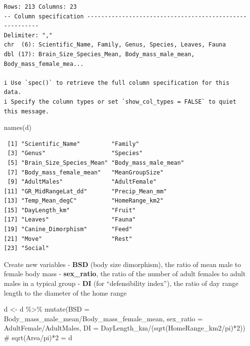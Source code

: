 \documentclass[
  letterpaper,
  DIV=11,
  numbers=noendperiod]{scrartcl}
\newenvironment{Shaded}{\begin{snugshade}}{\end{snugshade}}
\newcommand{\AttributeTok}[1]{\textcolor[rgb]{0.40,0.45,0.13}{#1}}
\newcommand{\CommentTok}[1]{\textcolor[rgb]{0.37,0.37,0.37}{#1}}
\newcommand{\DecValTok}[1]{\textcolor[rgb]{0.68,0.00,0.00}{#1}}
\newcommand{\FunctionTok}[1]{\textcolor[rgb]{0.28,0.35,0.67}{#1}}
\newcommand{\NormalTok}[1]{\textcolor[rgb]{0.00,0.23,0.31}{#1}}
\newcommand{\OtherTok}[1]{\textcolor[rgb]{0.00,0.23,0.31}{#1}}
\newcommand{\SpecialCharTok}[1]{\textcolor[rgb]{0.37,0.37,0.37}{#1}}
\begin{document}
\begin{verbatim}
Rows: 213 Columns: 23
-- Column specification --------------------------------------------------------
Delimiter: ","
chr  (6): Scientific_Name, Family, Genus, Species, Leaves, Fauna
dbl (17): Brain_Size_Species_Mean, Body_mass_male_mean, Body_mass_female_mea...

i Use `spec()` to retrieve the full column specification for this data.
i Specify the column types or set `show_col_types = FALSE` to quiet this message.
\end{verbatim}

\begin{Shaded}
\begin{Highlighting}[]
\FunctionTok{names}\NormalTok{(d)}
\end{Highlighting}
\end{Shaded}

\begin{verbatim}
 [1] "Scientific_Name"         "Family"                 
 [3] "Genus"                   "Species"                
 [5] "Brain_Size_Species_Mean" "Body_mass_male_mean"    
 [7] "Body_mass_female_mean"   "MeanGroupSize"          
 [9] "AdultMales"              "AdultFemale"            
[11] "GR_MidRangeLat_dd"       "Precip_Mean_mm"         
[13] "Temp_Mean_degC"          "HomeRange_km2"          
[15] "DayLength_km"            "Fruit"                  
[17] "Leaves"                  "Fauna"                  
[19] "Canine_Dimorphism"       "Feed"                   
[21] "Move"                    "Rest"                   
[23] "Social"                 
\end{verbatim}

Create new variables - \textbf{BSD} (body size dimorphism), the ratio of
mean male to female body mass - \textbf{sex\_ratio}, the ratio of the
number of adult females to adult males in a typical group - \textbf{DI}
(for ``defensibility index''), the ratio of day range length to the
diameter of the home range

\begin{Shaded}
\begin{Highlighting}[]
\NormalTok{d }\OtherTok{\textless{}{-}}\NormalTok{ d }\SpecialCharTok{\%\textgreater{}\%} 
  \FunctionTok{mutate}\NormalTok{(}\AttributeTok{BSD =}\NormalTok{ Body\_mass\_male\_mean}\SpecialCharTok{/}\NormalTok{Body\_mass\_female\_mean, }
         \AttributeTok{sex\_ratio =}\NormalTok{ AdultFemale}\SpecialCharTok{/}\NormalTok{AdultMales,}
         \AttributeTok{DI =}\NormalTok{ DayLength\_km}\SpecialCharTok{/}\NormalTok{(}\FunctionTok{sqrt}\NormalTok{(HomeRange\_km2}\SpecialCharTok{/}\NormalTok{pi)}\SpecialCharTok{*}\DecValTok{2}\NormalTok{)) }\CommentTok{\# sqrt(Area/pi)*2 = d}
\end{Highlighting}
\end{Shaded}
\end{document}
